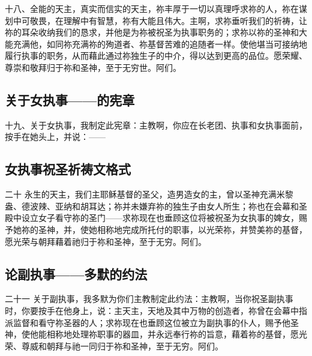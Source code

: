 十八、全能的天主，真实而信实的天主，祢丰厚于一切以真理呼求祢的人，祢在谋划中可敬畏，在理解中有智慧，祢有大能且伟大。主啊，求祢垂听我们的祈祷，让祢的耳朵收纳我们的恳求，并他是为祢被祝圣为执事职务的；求祢以祢的圣神和大能充满他，如同祢充满祢的殉道者、祢基督苦难的追随者一样。使他堪当可接纳地履行执事的职务，从而藉此通过祢独生子的中介，得以达到更高的品位。愿荣耀、尊崇和敬拜归于祢和圣神，至于无穷世。阿们。\par


\subsection{关于女执事——的宪章}

十九、关于女执事，我制定此宪章：主教啊，你应在长老团、执事和女执事面前，按手在她头上，并说：——\par


\subsection{女执事祝圣祈祷文格式}

二十 永生的天主，我们主耶稣基督的圣父，造男造女的主，曾以圣神充满米黎盎、德波辣、亚纳和胡耳达；祢并未嫌弃祢的独生子由女人所生；祢也在会幕和圣殿中设立女子看守祢的圣门——求祢现在也垂顾这位将被祝圣为女执事的婢女，赐予她祢的圣神，并，使她相称地完成所托付的职事，以光荣祢，并赞美祢的基督，愿光荣与朝拜藉着祂归于祢和圣神，至于无穷。阿们。\par


\subsection{论副执事——多默的约法}

二十一 关于副执事，我多默为你们主教制定此约法：主教啊，当你祝圣副执事时，你要按手在他身上，说：主天主，天地及其中万物的创造者，祢曾在会幕中指派监督和看守祢圣器的人；求祢现在也垂顾这位被立为副执事的仆人，赐予他圣神，使他能相称地处理祢职事的器皿，并永远奉行祢的旨意，藉着祢的基督，愿光荣、尊威和朝拜与祂一同归于祢和圣神，至于无穷。阿们。\par

